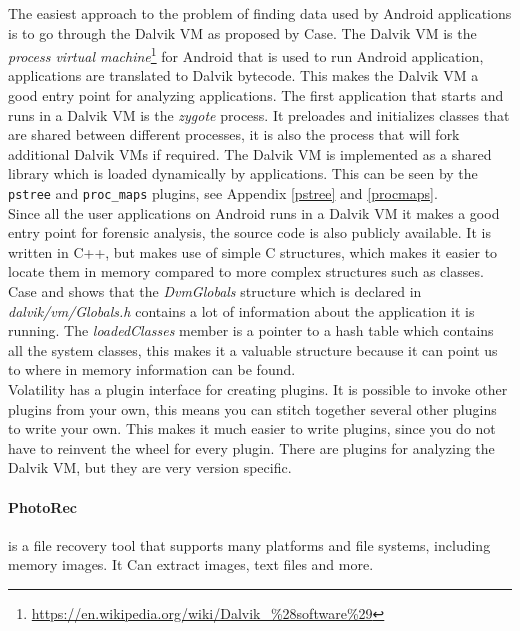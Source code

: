   The easiest approach to the problem of finding data used by Android
  applications is to go through the Dalvik VM as proposed by Case\cite{case2011}.
  The Dalvik VM is the \textit{process virtual
  machine}\footnote{\url{https://en.wikipedia.org/wiki/Dalvik\_\%28software\%29}} for
  Android that is used to run Android application, applications are translated to
  Dalvik bytecode. This makes the Dalvik VM a good entry point for analyzing
  applications. The first application that starts and runs in a Dalvik VM is the
  \textit{zygote} process. It preloades and initializes classes that are shared
  between different processes, it is also the process that will fork additional
  Dalvik VMs if required. The Dalvik VM is implemented as a shared library which
  is loaded dynamically by applications. This can be seen by the \texttt{pstree} and
  \texttt{proc\_maps} plugins, see Appendix \ref{pstree} and \ref{procmaps}. \\

  Since all the user applications on Android runs in a Dalvik VM it makes a good entry
  point for forensic analysis, the source code is also publicly available. It is
  written in C++, but makes use of simple C structures, which makes it easier to
  locate them in memory compared to more complex structures such as classes. Case
  and \cite{holger} shows that the \textit{DvmGlobals} structure which is
  declared in \textit{dalvik/vm/Globals.h} contains a lot of information about
  the application it is running. The \textit{loadedClasses} member is a pointer
  to a hash table which contains all the system classes, this makes it a
  valuable structure because it can point us to where in memory information can
  be found.\\

  Volatility has a plugin interface for creating plugins. It is possible to
  invoke other plugins from your own, this means you can stitch together
  several other plugins to write your own. This makes it much easier to write
  plugins, since you do not have to reinvent the wheel for every plugin. There
  are plugins for analyzing the Dalvik VM, but they are very version specific.

  \paragraph{PhotoRec} is a file recovery tool that supports many platforms and file systems, including memory images. 
  It Can extract images, text files and more. %

